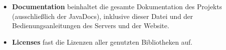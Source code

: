 \begin{itemize}
    \item \textbf{Documentation}
    beinhaltet die gesamte Dokumentation des Projekts
    (ausschließlich der JavaDocs),
    inklusive dieser Datei und der Bedienungsanleitungen des Servers und der Website.

    \item \textbf{Licenses}
    fast die Lizenzen aller genutzten Bibliotheken auf.
\end{itemize}
